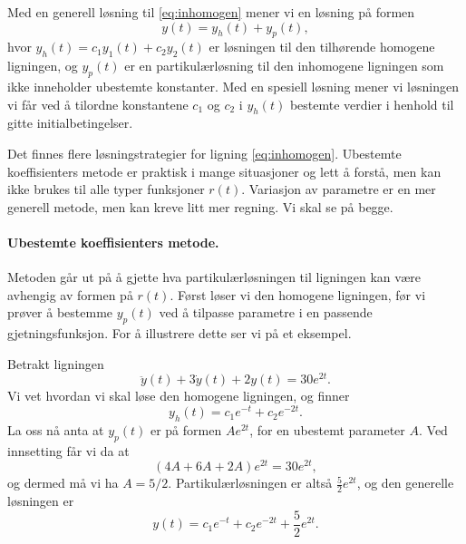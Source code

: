 \documentclass{article}
\theoremstyle{definition}
\theoremstyle{remark}
\newenvironment{defn}
{\pushQED{\qed}\renewcommand{\qedsymbol}{$\triangle$}\defnx}
{\popQED\enddefnx}
\newenvironment{ex}
{\pushQED{\qed}\renewcommand{\qedsymbol}{$\triangle$}\exx}
{\popQED\endexx}
\begin{document}
\begin{multicols*}{2}
\begin{defn}
    Med en generell løsning til \eqref{eq:inhomogen} mener vi en løsning på formen
    \begin{equation*}
        y(t) = y_h(t) + y_p(t),    
    \end{equation*}
    hvor $y_h(t) = c_1 y_1(t) + c_2 y_2(t)$ er løsningen til den tilhørende homogene ligningen, og $y_p(t)$ er en partikulærløsning til den inhomogene ligningen som ikke inneholder ubestemte konstanter. Med en spesiell løsning mener vi løsningen vi får ved å tilordne konstantene $c_1$ og $c_2$ i $y_h(t)$ bestemte verdier i henhold til gitte initialbetingelser.
\end{defn}

Det finnes flere løsningstrategier for ligning \eqref{eq:inhomogen}. Ubestemte koeffisienters metode er praktisk i mange situasjoner og lett å forstå, men kan ikke brukes til alle typer funksjoner $r(t)$. Variasjon av parametre er en mer generell metode, men kan kreve litt mer regning. Vi skal se på begge.

\paragraph*{Ubestemte koeffisienters metode.} Metoden går ut på å gjette hva partikulærløsningen til ligningen kan være avhengig av formen på $r(t)$. Først løser vi den homogene ligningen, før vi prøver å bestemme $y_p(t)$ ved å tilpasse parametre i en passende gjetningsfunksjon. For å illustrere dette ser vi på et eksempel.

\begin{ex}
  Betrakt ligningen
  \begin{equation*}
    \ddot{y}(t) + 3 \dot{y}(t) + 2 y(t) = 30 e^{2 t}.
  \end{equation*}
  Vi vet hvordan vi skal løse den homogene ligningen, og finner
  \begin{equation*}
    y_h(t) = c_1 e^{-t} + c_2 e^{-2 t}.
  \end{equation*}
  La oss nå anta at $y_p(t)$ er på formen $A e^{2t}$, for en ubestemt parameter $A$. Ved innsetting får vi da at
  \begin{equation*}
    (4 A + 6 A + 2 A) e^{2 t} = 30 e^{2 t},
  \end{equation*}
  og dermed må vi ha $A = 5/2$. Partikulærløsningen er altså $\frac{5}{2} e^{2 t}$, og den generelle løsningen er
  \begin{equation*}
    y(t) = c_1 e^{-t} + c_2 e^{-2 t} + \frac{5}{2} e^{2 t}.
  \end{equation*}
\end{ex}


\end{multicols*}
\end{document}
